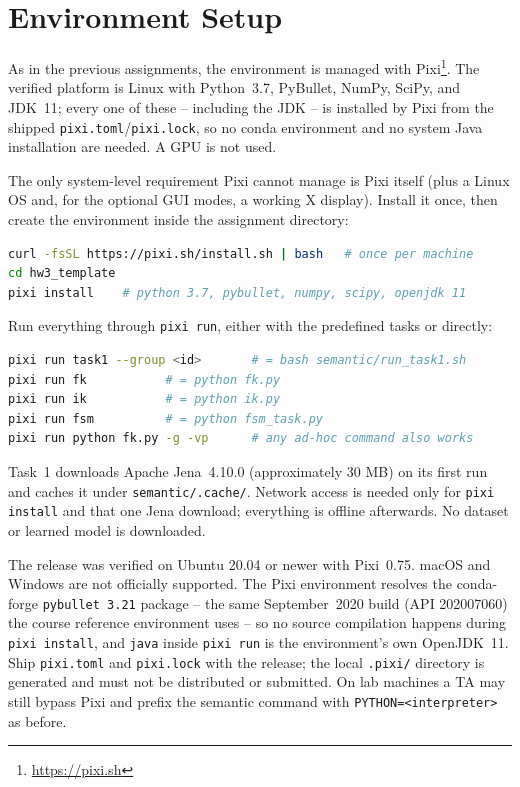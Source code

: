 \documentclass[11pt]{article}
\newcommand{\code}[1]{\nolinkurl{#1}}
\begin{document}
\section{Environment Setup}

As in the previous assignments, the environment is managed with
Pixi\footnote{\url{https://pixi.sh}}. The verified platform is Linux with
Python~3.7, PyBullet, NumPy, SciPy, and JDK~11; every one of these --
including the JDK -- is installed by Pixi from the shipped
\code{pixi.toml}/\code{pixi.lock}, so no conda environment and no system Java
installation are needed. A GPU is not used.

The only system-level requirement Pixi cannot manage is Pixi itself (plus a
Linux OS and, for the optional GUI modes, a working X display). Install it
once, then create the environment inside the assignment directory:

\begin{lstlisting}[language=bash]
curl -fsSL https://pixi.sh/install.sh | bash   # once per machine
cd hw3_template
pixi install    # python 3.7, pybullet, numpy, scipy, openjdk 11
\end{lstlisting}

Run everything through \texttt{pixi run}, either with the predefined tasks or
directly:

\begin{lstlisting}[language=bash]
pixi run task1 --group <id>       # = bash semantic/run_task1.sh
pixi run fk           # = python fk.py
pixi run ik           # = python ik.py
pixi run fsm          # = python fsm_task.py
pixi run python fk.py -g -vp      # any ad-hoc command also works
\end{lstlisting}

Task~1 downloads Apache Jena~4.10.0 (approximately 30 MB) on its first run and
caches it under \code{semantic/.cache/}. Network access is needed only for
\texttt{pixi install} and that one Jena download; everything is offline
afterwards. No dataset or learned model is downloaded.

\begin{tutornote}
The release was verified on Ubuntu 20.04 or newer with Pixi~0.75. macOS and
Windows are not officially supported. The Pixi environment resolves the
conda-forge \code{pybullet 3.21} package -- the same September~2020 build (API
202007060) the course reference environment uses -- so no source compilation
happens during \texttt{pixi install}, and \code{java} inside \texttt{pixi run} is
the environment's own OpenJDK~11. Ship \code{pixi.toml} and \code{pixi.lock}
with the release; the local \code{.pixi/} directory is generated and must not
be distributed or submitted. On lab machines a TA may still bypass Pixi and
prefix the semantic command with \code{PYTHON=<interpreter>} as before.
\end{tutornote}
\end{document}
